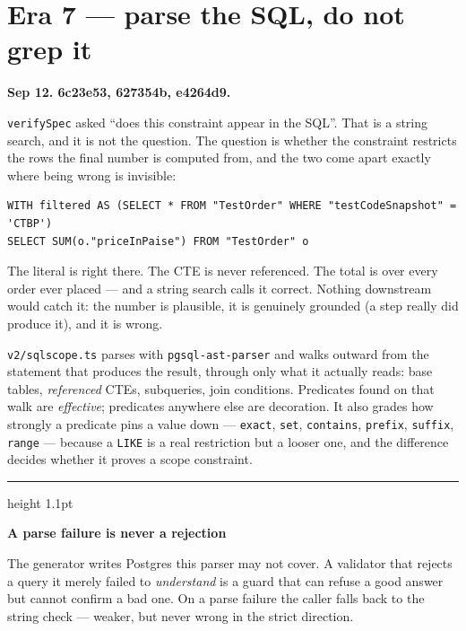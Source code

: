 \documentclass[11pt,a4paper]{report}
\newcommand{\file}[1]{\texttt{\small #1}}
\newcommand{\code}[1]{\texttt{\small #1}}
\newcommand{\sha}[1]{{\ttfamily\small\color{slate}#1}}
\newenvironment{keybox}[1]
 {\par\medskip\begin{center}\begin{minipage}{0.94\textwidth}%
  {\color{navy}\hrule height 1.1pt}\vspace{5pt}\par
  \textbf{\color{navy}#1}\par\vspace{3pt}\small}
 {\par\vspace{5pt}{\color{mist}\hrule height 0.8pt}\end{minipage}\end{center}\medskip}
\begin{document}
\section{Era 7 --- parse the SQL, do not grep it}
\label{sec:sqlscope}

\textbf{Sep 12. \sha{6c23e53}, \sha{627354b}, \sha{e4264d9}.}

\code{verifySpec} asked ``does this constraint appear in the SQL''. That is a string search, and it
is not the question. The question is whether the constraint restricts the rows the final number is
computed from, and the two come apart exactly where being wrong is invisible:

\begin{lstlisting}
WITH filtered AS (SELECT * FROM "TestOrder" WHERE "testCodeSnapshot" = 'CTBP')
SELECT SUM(o."priceInPaise") FROM "TestOrder" o
\end{lstlisting}

\noindent The literal is right there. The CTE is never referenced. The total is over every order
ever placed --- and a string search calls it correct. Nothing downstream would catch it: the number
is plausible, it is genuinely grounded (a step really did produce it), and it is wrong.

\file{v2/sqlscope.ts} parses with \code{pgsql-ast-parser} and walks outward from the statement that
produces the result, through only what it actually reads: base tables, \emph{referenced} CTEs,
subqueries, join conditions. Predicates found on that walk are \emph{effective}; predicates
anywhere else are decoration. It also grades how strongly a predicate pins a value down ---
\code{exact}, \code{set}, \code{contains}, \code{prefix}, \code{suffix}, \code{range} --- because a
\code{LIKE} is a real restriction but a looser one, and the difference decides whether it proves a
scope constraint.

\begin{keybox}{A parse failure is never a rejection}
The generator writes Postgres this parser may not cover. A validator that rejects a query it merely
failed to \emph{understand} is a guard that can refuse a good answer but cannot confirm a bad one.
On a parse failure the caller falls back to the string check --- weaker, but never wrong in the
strict direction.
\end{keybox}
\end{document}
